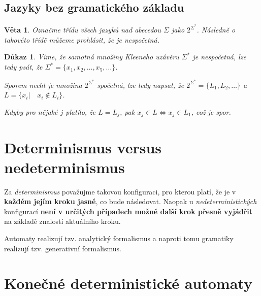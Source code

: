 \documentclass[10pt, a4paper, titlepage]{article}
\theoremstyle{note}
\newtheorem{veta}{Věta}
\newtheorem{dukaz}{Důkaz}
\begin{document}

\subsection{Jazyky bez gramatického základu}

\begin{veta}
Označme třídu všech jazyků nad abecedou $\Sigma$ jako $2^{\Sigma^{*}}$. Následně o takovéto třídě můžeme prohlásit,
že je nespočetná.
\end{veta}

\begin{dukaz}
Víme, že samotná množiny Kleeneho uzávěru $\Sigma^{*}$ je nespočetná, lze tedy psát,
že $\Sigma^* = \lbrace x_1,x_2,\ldots,x_5,\ldots \rbrace$.

Sporem nechť je množina $2^{\Sigma^{*}}$ spočetná, lze tedy napsat, že $2^{\Sigma^{*}} = \lbrace L_1, L_2, \ldots \rbrace$
a $L = \lbrace x_i | \quad x_i \notin L_i \rbrace$.

Kdyby pro nějaké $j$ platilo, že $L = L_j$, pak $x_j \in L \Longleftrightarrow x_j \in L_1$, což je spor.
\end{dukaz}


\section{Determinismus versus nedeterminismus}
Za \emph{determinismus} považujme takovou konfiguraci, pro kterou platí, že je v \textbf{každém jejím kroku jasné}, co bude následovat.
Naopak u \emph{nedeterministických} konfigurací \textbf{není v určitých případech možné další krok přesně vyjádřit} na základě znalostí aktuálního kroku.

Automaty realizují tzv. analytický formalismus a naproti tomu gramatiky realizují tzv. generativní formalismus.

\section{Konečné deterministické automaty}
\end{document}
